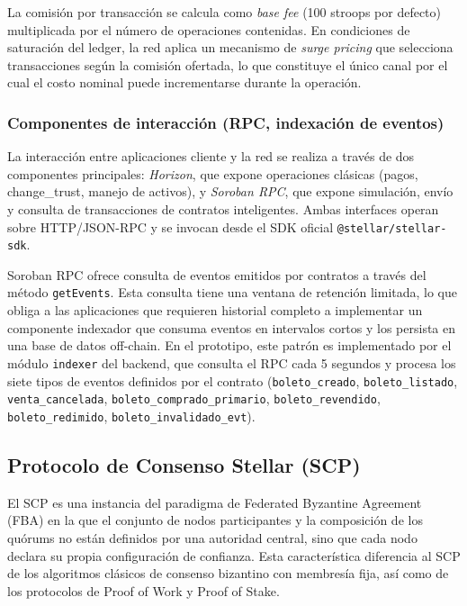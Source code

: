 La comisión por transacción se calcula como \textit{base fee} (100 stroops por defecto) multiplicada por el número de operaciones contenidas. En condiciones de saturación del ledger, la red aplica un mecanismo de \textit{surge pricing} que selecciona transacciones según la comisión ofertada, lo que constituye el único canal por el cual el costo nominal puede incrementarse durante la operación.

\subsubsection{Componentes de interacción (RPC, indexación de eventos)}

La interacción entre aplicaciones cliente y la red se realiza a través de dos componentes principales: \textit{Horizon}, que expone operaciones clásicas (pagos, change\_trust, manejo de activos), y \textit{Soroban RPC}, que expone simulación, envío y consulta de transacciones de contratos inteligentes. Ambas interfaces operan sobre HTTP/JSON-RPC y se invocan desde el SDK oficial \texttt{@stellar/stellar-sdk}.

Soroban RPC ofrece consulta de eventos emitidos por contratos a través del método \texttt{getEvents}. Esta consulta tiene una ventana de retención limitada, lo que obliga a las aplicaciones que requieren historial completo a implementar un componente indexador que consuma eventos en intervalos cortos y los persista en una base de datos off-chain. En el prototipo, este patrón es implementado por el módulo \texttt{indexer} del backend, que consulta el RPC cada 5 segundos y procesa los siete tipos de eventos definidos por el contrato (\texttt{boleto\_creado}, \texttt{boleto\_listado}, \texttt{venta\_cancelada}, \texttt{boleto\_comprado\_primario}, \texttt{boleto\_revendido}, \texttt{boleto\_redimido}, \texttt{boleto\_invalidado\_evt}).

\subsection{Protocolo de Consenso Stellar (SCP)}

El SCP es una instancia del paradigma de Federated Byzantine Agreement (FBA) en la que el conjunto de nodos participantes y la composición de los quórums no están definidos por una autoridad central, sino que cada nodo declara su propia configuración de confianza. Esta característica diferencia al SCP de los algoritmos clásicos de consenso bizantino con membresía fija, así como de los protocolos de Proof of Work y Proof of Stake.

